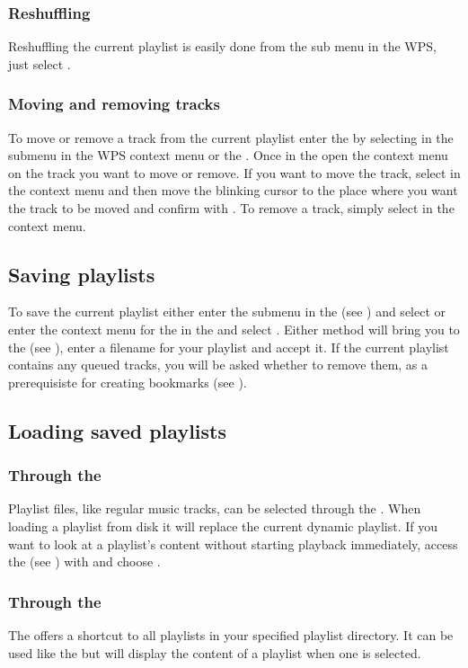 \subsubsection{Reshuffling}
Reshuffling the current playlist is easily done from the 
sub menu in the WPS, just select .

\subsubsection{Moving and removing tracks}
To move or remove a track from the current playlist enter the
 by selecting  in the
 submenu in the WPS context menu or the .
Once in the  open the context menu on the track you
want to move or remove. If you want to move the track, select  in
the context menu and then move the blinking cursor to the place where you want
the track to be moved and confirm with \ActionStdOk. To remove a track, simply
select  in the context menu.

\subsection{Saving playlists}
To save the current playlist either enter the  submenu
in the  (see ) and
select  or enter the context menu for the
 in the  and select
.
Either method will bring you to the  (see
), enter a filename for your playlist and
accept it. If the current playlist contains any queued tracks, you will be
asked whether to remove them, as a prerequisiste for creating bookmarks
(see ).

\subsection{Loading saved playlists}
\subsubsection{Through the }
Playlist files, like regular music tracks, can be selected through the
. When loading a playlist from disk it will replace
the current dynamic playlist. If you want to look at a playlist's
content without starting playback immediately, access the  (see
) with \ActionStdContext{} and choose .

\subsubsection{Through the }
The  offers a shortcut to all playlists in your
\daps{} specified playlist directory.
It can be used like the  but will display
the content of a playlist when one is selected.

